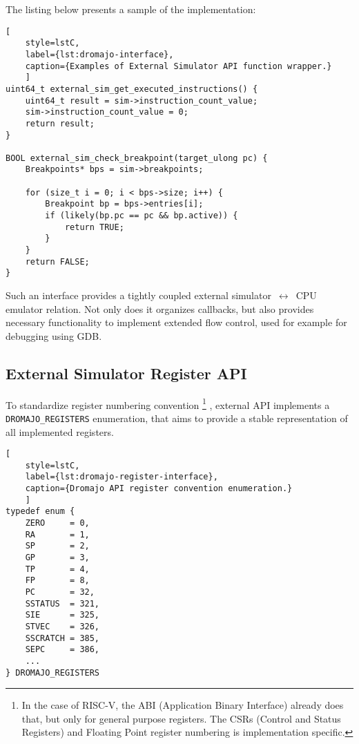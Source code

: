 \noindent
The listing below presents a sample of the implementation:

\begin{lstlisting}[
    style=lstC,
    label={lst:dromajo-interface},
    caption={Examples of External Simulator API function wrapper.}
    ]
uint64_t external_sim_get_executed_instructions() {
    uint64_t result = sim->instruction_count_value;
    sim->instruction_count_value = 0;
    return result;
}

BOOL external_sim_check_breakpoint(target_ulong pc) {
    Breakpoints* bps = sim->breakpoints;

    for (size_t i = 0; i < bps->size; i++) {
        Breakpoint bp = bps->entries[i];
        if (likely(bp.pc == pc && bp.active)) {
            return TRUE;
        }
    }
    return FALSE;
}
\end{lstlisting}

\noindent
Such an interface provides a tightly coupled external simulator\ $\leftrightarrow$\ CPU emulator relation. Not only does
it organizes callbacks, but also provides necessary functionality to implement extended flow control, used for example
for debugging using GDB.

\pagebreak

\subsection{External Simulator Register API}

To standardize register numbering convention%
\footnote{In the case of RISC-V, the ABI (Application Binary Interface)
already does that, but only for general purpose registers. The CSRs (Control and Status Registers) and Floating Point
register numbering is implementation specific.}%
, external API implements a \texttt{DROMAJO\_REGISTERS} enumeration, that aims to provide a stable representation of
all implemented registers.

\begin{lstlisting}[
    style=lstC,
    label={lst:dromajo-register-interface},
    caption={Dromajo API register convention enumeration.}
    ]
typedef enum {
    ZERO     = 0,
    RA       = 1,
    SP       = 2,
    GP       = 3,
    TP       = 4,
    FP       = 8,
    PC       = 32,
    SSTATUS  = 321,
    SIE      = 325,
    STVEC    = 326,
    SSCRATCH = 385,
    SEPC     = 386,
    ...
} DROMAJO_REGISTERS
\end{lstlisting}

